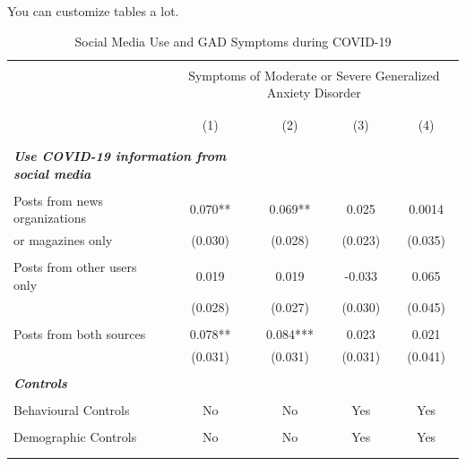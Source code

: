 \documentclass{article}[12pt]
\begin{document}
        You can customize tables a lot.
        
        \begin{table}[H]
            \centering
            \caption{Social Media Use and GAD Symptoms during COVID-19}
            \setlength{\tabcolsep}{10pt}
            \renewcommand{\arraystretch}{.55}
            \setlength{\tabcolsep}{6pt}
            \renewcommand{\arraystretch}{.55}
            \begin{tabular}{lcccc}
                \hline
                 \\
                & \multicolumn{4}{c}{Symptoms of Moderate or Severe Generalized Anxiety Disorder}
                \\\\\hline\\
                & (1) & (2) & (3) & (4)
                \\\\\hline\\
                \multicolumn{2}{l}{\bf \textit{Use COVID-19 information from social media}} \\
                 \\
                Posts from news organizations & 0.070** & 0.069** & 0.025 & 0.0014 \\
                or magazines only & (0.030) & (0.028) & (0.023) & (0.035)\\
                 \\
                Posts from other users only
                 & 0.019 & 0.019 & -0.033 & 0.065 \\
                 & (0.028) & (0.027) & (0.030) & (0.045) \\
                 \\
                Posts from both sources & 0.078** & 0.084*** & 0.023 & 0.021 
                \\
                 & (0.031) & (0.031) & (0.031) & (0.041) \\
                \\
                \multicolumn{2}{l}{\bf \textit{Controls}} \\
                 \\
                Behavioural Controls & No & No & Yes & Yes \\
                 \\
                Demographic Controls & No & No & Yes & Yes \\
                 \\\\

\end{tabular}
\end{table}
\end{document}
